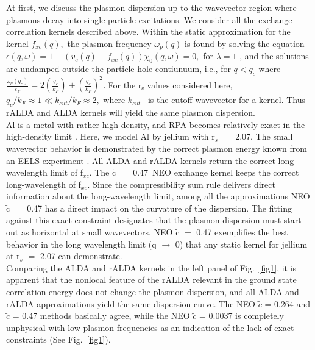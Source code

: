 \documentclass[aps,amsmath,amssymb, preprint, 12pt]{revtex4-1}
\begin{document}
At first, we discuss the plasmon dispersion up to the wavevector region where plasmons decay into single-particle excitations. We consider all the exchange-correlation kernels described above. Within the static approximation for the kernel  \( f_{xc} \left( q \right) , \)  the plasmon frequency  \(  \omega _{p} \left( q \right)  \)  is found by solving the equation  \(  \epsilon  \left( q, \omega  \right) =1- \left( v_{c} \left( q \right) +f_{xc} \left( q \right)  \right)  \chi _{0} \left( q , \omega \right) =0, \)  for  \(  \lambda =1  \) \cite{TSS01}, and the solutions are undamped outside the particle-hole contiunuum, i.e., for  \( q<q_{c} \)  where  \( \frac{ \omega _{p} \left( q_c \right) }{ \varepsilon _{F}}=2 \left( \frac{q_{c}}{k_{F}} \right) + \left( \frac{q_{c}}{k_{F}} \right) ^{2}. \)  For the r\textsubscript{s }values considered here,  \( q_{c}/k_{F} \approx 1 \ll k_{cut}/k_{F} \approx 2, \)  where  \( k_{cut} \) \  is the cutoff wavevector for a kernel. Thus rALDA and ALDA kernels will yield the same plasmon dispersion.\\

Al is a metal with rather high density, and RPA becomes relatively exact in the high-density limit \cite{QE93}. Here, we model Al by jellium with r$_s$ $=$ 2.07. The small wavevector behavior is demonstrated by the correct plasmon energy known from an EELS experiment \cite{PO75}. All ALDA and rALDA kernels return the correct long-wavelength limit of f$_{xc}$. The $\widetilde{\text{c}}$ \(  =  \) 0.47\  NEO exchange kernel keeps the correct long-wavelength of f$_{xc}$. Since the compressibility sum rule delivers direct information about the long-wavelength limit, among all the approximations NEO $\widetilde{\text{c}}$ \(  =  \) 0.47 has a direct impact on the curvature of the dispersion. The fitting against this exact constraint designates that the plasmon dispersion must start out as horizontal at small wavevectors. NEO $\widetilde{\text{c}}$ \(  =  \) 0.47 exemplifies the best behavior in the long wavelength limit (q $\rightarrow$ 0) that any static kernel for jellium at r$_s$ $=$ 2.07 can demonstrate.\\

Comparing the ALDA and rALDA kernels in the left panel of Fig.~\ref{fig1}, it is apparent that the nonlocal feature of the rALDA relevant in the ground state correlation energy does not change the plasmon dispersion, and all ALDA and rALDA approximations yield the same dispersion curve. The NEO  \( \widetilde{c} \) = 0.264 and  \( \widetilde{c} \) = 0.47 methods basically agree, while the NEO \( \widetilde{c} \) = 0.0037 is completely unphysical with low plasmon frequencies as an indication of the lack of exact constraints (See Fig.~\ref{fig1}).
\end{document}
